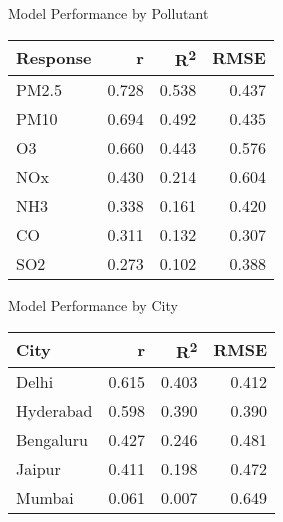 \documentclass[svgnames, 10pt]{beamer}
\begin{document}
\begin{frame}{Model Performance by Pollutant}
    \begin{table}
    \centering
    \begin{tabular}{lrrr}
    \hline
    Response & r & R\textsuperscript{2} & RMSE \\
    \hline
    PM2.5 & 0.728 & 0.538 & 0.437 \\
    PM10 & 0.694 & 0.492 & 0.435 \\
    O3 & 0.660 & 0.443 & 0.576 \\
    NOx & 0.430 & 0.214 & 0.604 \\
    NH3 & 0.338 & 0.161 & 0.420 \\
    CO & 0.311 & 0.132 & 0.307 \\
    SO2 & 0.273 & 0.102 & 0.388 \\
    \hline
    \end{tabular}
    \end{table}
    \end{frame}
    
    \begin{frame}{Model Performance by City}
    \begin{table}
    \centering
    \begin{tabular}{lrrr}
    \hline
    City & r & R\textsuperscript{2} & RMSE \\
    \hline
    Delhi & 0.615 & 0.403 & 0.412 \\
    Hyderabad & 0.598 & 0.390 & 0.390 \\
    Bengaluru & 0.427 & 0.246 & 0.481 \\
    Jaipur & 0.411 & 0.198 & 0.472 \\
    Mumbai & 0.061 & 0.007 & 0.649 \\
    \hline
    \end{tabular}
    \end{table}
\end{frame}
\end{document}
